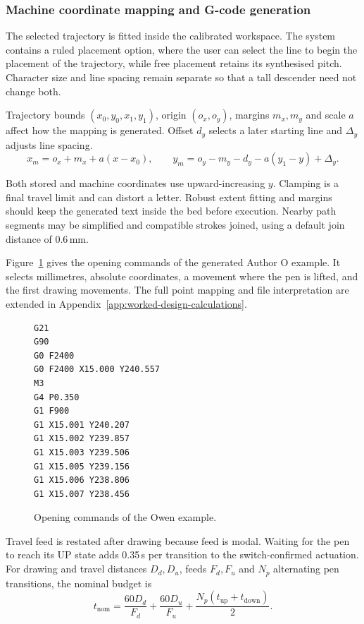 \subsubsection{Machine coordinate mapping and G-code generation}
\label{sec:des-gcode}
The selected trajectory is fitted inside the calibrated workspace. The system contains a ruled placement option, where the user can select the line to begin the placement of the trajectory, while free placement retains its synthesised pitch. Character size and line spacing remain separate so that a tall descender need not change both.

Trajectory bounds $(x_0,y_0,x_1,y_1)$, origin $(o_x,o_y)$, margins $m_x,m_y$ and scale $a$ affect how the mapping is generated. Offset $d_y$ selects a later starting line and $\Delta_y$ adjusts line spacing.
\begin{equation}
x_m=o_x+m_x+a(x-x_0),\qquad
y_m=o_y-m_y-d_y-a(y_1-y)+\Delta_y.
\label{eq:des-machinecoords}
\end{equation}

Both stored and machine coordinates use upward-increasing $y$. Clamping is a final travel limit and can distort a letter. Robust extent fitting and margins should keep the generated text inside the bed before execution. Nearby path segments may be simplified and compatible strokes joined, using a default join distance of 0.6\,mm.

Figure~\ref{fig:des-gcode-excerpt} gives the opening commands of the generated Author O example. It selects millimetres, absolute coordinates, a movement where the pen is lifted, and the first drawing movements. The full point mapping and file interpretation are extended in Appendix~\ref{app:worked-design-calculations}.
\begin{figure}[H]
\begin{lstlisting}[style=designcode]
G21
G90
G0 F2400
G0 F2400 X15.000 Y240.557
M3
G4 P0.350
G1 F900
G1 X15.001 Y240.207
G1 X15.002 Y239.857
G1 X15.003 Y239.506
G1 X15.005 Y239.156
G1 X15.006 Y238.806
G1 X15.007 Y238.456
\end{lstlisting}
\caption{Opening commands of the Owen example.}
\label{fig:des-gcode-excerpt}
\end{figure}

Travel feed is restated after drawing because feed is modal. Waiting for the pen to reach its UP state adds 0.35\,s per transition to the switch-confirmed actuation. For drawing and travel distances $D_d,D_u$, feeds $F_d,F_u$ and $N_p$ alternating pen transitions, the nominal budget is
\begin{equation}
t_{\mathrm{nom}}=\frac{60D_d}{F_d}+\frac{60D_u}{F_u}
+\frac{N_p(t_{\mathrm{up}}+t_{\mathrm{down}})}{2}.
\label{eq:des-timebudget}
\end{equation}

